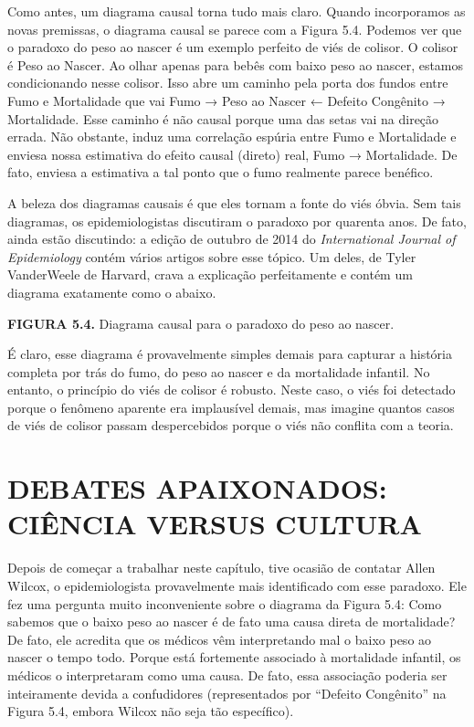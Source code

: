 \documentclass[11pt,a5paper,twoside]{book}
\begin{document}
Como antes, um diagrama causal torna tudo mais claro. Quando incorporamos as novas premissas, o diagrama causal se parece com a Figura 5.4. Podemos ver que o paradoxo do peso ao nascer é um exemplo perfeito de viés de colisor. O colisor é Peso ao Nascer. Ao olhar apenas para bebês com baixo peso ao nascer, estamos condicionando nesse colisor. Isso abre um caminho pela porta dos fundos entre Fumo e Mortalidade que vai Fumo → Peso ao Nascer ← Defeito Congênito → Mortalidade. Esse caminho é não causal porque uma das setas vai na direção errada. Não obstante, induz uma correlação espúria entre Fumo e Mortalidade e enviesa nossa estimativa do efeito causal (direto) real, Fumo → Mortalidade. De fato, enviesa a estimativa a tal ponto que o fumo realmente parece benéfico.

A beleza dos diagramas causais é que eles tornam a fonte do viés óbvia. Sem tais diagramas, os epidemiologistas discutiram o paradoxo por quarenta anos. De fato, ainda estão discutindo: a edição de outubro de 2014 do \textit{International Journal of Epidemiology} contém vários artigos sobre esse tópico. Um deles, de Tyler VanderWeele de Harvard, crava a explicação perfeitamente e contém um diagrama exatamente como o abaixo.

\textbf{FIGURA 5.4.} Diagrama causal para o paradoxo do peso ao nascer.

É claro, esse diagrama é provavelmente simples demais para capturar a história completa por trás do fumo, do peso ao nascer e da mortalidade infantil. No entanto, o princípio do viés de colisor é robusto. Neste caso, o viés foi detectado porque o fenômeno aparente era implausível demais, mas imagine quantos casos de viés de colisor passam despercebidos porque o viés não conflita com a teoria.

\section{DEBATES APAIXONADOS: CIÊNCIA VERSUS CULTURA}
Depois de começar a trabalhar neste capítulo, tive ocasião de contatar Allen Wilcox, o epidemiologista provavelmente mais identificado com esse paradoxo. Ele fez uma pergunta muito inconveniente sobre o diagrama da Figura 5.4: Como sabemos que o baixo peso ao nascer é de fato uma causa direta de mortalidade? De fato, ele acredita que os médicos vêm interpretando mal o baixo peso ao nascer o tempo todo. Porque está fortemente associado à mortalidade infantil, os médicos o interpretaram como uma causa. De fato, essa associação poderia ser inteiramente devida a confudidores (representados por “Defeito Congênito” na Figura 5.4, embora Wilcox não seja tão específico).
\end{document}
